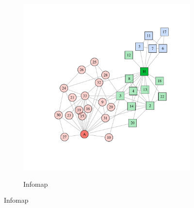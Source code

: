 \begin{figure}
\begin{subfigure}[b]{0.32\textwidth}
\label{fig:fast_greedy}
\end{subfigure}
\hfill
\begin{subfigure}[b]{0.32\textwidth}
\caption{Infomap}
\includegraphics[width=\textwidth,trim={0.75in 0.75in 0.75in 0.75in}, clip=True]{infomap.pdf}
\label{fig:infomap}
\end{subfigure}


\end{figure}
